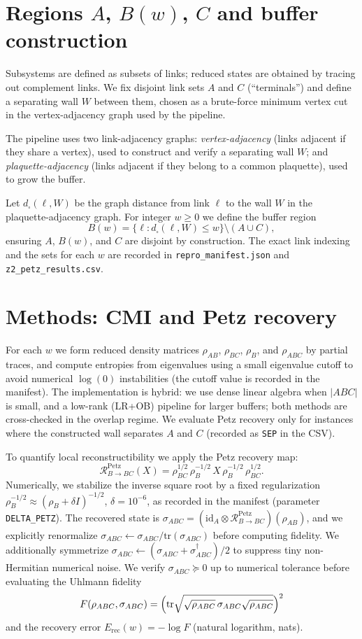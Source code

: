 \documentclass[11pt]{article}
\begin{document}
\section{Regions $A$, $B(w)$, $C$ and buffer construction}

Subsystems are defined as subsets of links; reduced states are obtained
by tracing out complement links. We fix disjoint link sets $A$ and $C$
(``terminals'') and define a separating wall $W$ between them, chosen as
a brute-force minimum vertex cut in the vertex-adjacency graph used by
the pipeline.

The pipeline uses two link-adjacency graphs: \emph{vertex-adjacency}
(links adjacent if they share a vertex), used to construct and verify a
separating wall $W$; and \emph{plaquette-adjacency} (links adjacent if
they belong to a common plaquette), used to grow the buffer.

Let $d_\square(\ell, W)$ be the graph distance from link $\ell$ to the
wall $W$ in the plaquette-adjacency graph. For integer $w \ge 0$ we
define the buffer region
\[
B(w) = \{\ell : d_\square(\ell, W) \le w\} \setminus (A \cup C),
\]
ensuring $A$, $B(w)$, and $C$ are disjoint by construction. The exact
link indexing and the sets for each $w$ are recorded in
\texttt{repro\_manifest.json} and \texttt{z2\_petz\_results.csv}.

\section{Methods: CMI and Petz recovery}

For each $w$ we form reduced density matrices $\rho_{AB}$, $\rho_{BC}$,
$\rho_B$, and $\rho_{ABC}$ by partial traces, and compute entropies from
eigenvalues using a small eigenvalue cutoff to avoid numerical $\log(0)$
instabilities (the cutoff value is recorded in the manifest). The
implementation is hybrid: we use dense linear algebra when $|ABC|$ is
small, and a low-rank (LR+OB) pipeline for larger buffers; both methods
are cross-checked in the overlap regime. We evaluate Petz recovery only
for instances where the constructed wall separates $A$ and $C$ (recorded
as \texttt{SEP} in the CSV).

To quantify local reconstructibility we apply the Petz recovery map:
\[
\mathcal{R}^{\mathrm{Petz}}_{B\to BC}(X) = \rho_{BC}^{1/2}\,
\rho_B^{-1/2}\, X\, \rho_B^{-1/2}\, \rho_{BC}^{1/2}.
\]
Numerically, we stabilize the inverse square root by a fixed
regularization $\rho_B^{-1/2} \approx (\rho_B + \delta I)^{-1/2}$,
$\delta = 10^{-6}$, as recorded in the manifest (parameter
\texttt{DELTA\_PETZ}). The recovered state is $\sigma_{ABC} =
(\mathrm{id}_A \otimes \mathcal{R}^{\mathrm{Petz}}_{B\to
BC})(\rho_{AB})$, and we explicitly renormalize $\sigma_{ABC} \leftarrow
\sigma_{ABC}/\mathrm{tr}(\sigma_{ABC})$ before computing fidelity. We
additionally symmetrize $\sigma_{ABC} \leftarrow (\sigma_{ABC} +
\sigma_{ABC}^\dagger)/2$ to suppress tiny non-Hermitian numerical noise.
We verify $\sigma_{ABC} \succeq 0$ up to numerical tolerance before
evaluating the Uhlmann fidelity
\[
F(\rho_{ABC}, \sigma_{ABC}) = \Bigl(\mathrm{tr}\sqrt{
\sqrt{\rho_{ABC}}\, \sigma_{ABC} \sqrt{\rho_{ABC}}}\Bigr)^2
\]
and the recovery error $E_{\mathrm{rec}}(w) = -\log F$ (natural
logarithm, nats).
\end{document}
